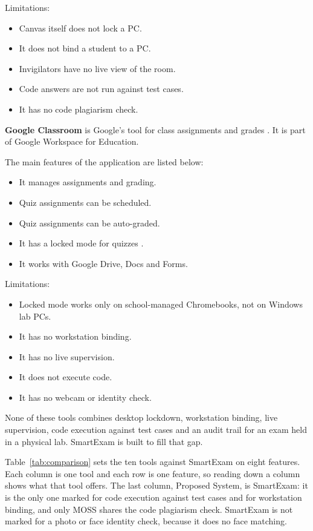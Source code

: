 \noindent Limitations:
\begin{itemize}[noitemsep]
\item Canvas itself does not lock a PC.
\item It does not bind a student to a PC.
\item Invigilators have no live view of the room.
\item Code answers are not run against test cases.
\item It has no code plagiarism check.
\end{itemize}

\noindent\textbf{Google Classroom} is Google's tool for class assignments and grades \cite{gclassroom1}. It is part of Google Workspace for Education.

\noindent The main features of the application are listed below:
\begin{itemize}[noitemsep]
\item It manages assignments and grading.
\item Quiz assignments can be scheduled.
\item Quiz assignments can be auto-graded.
\item It has a locked mode for quizzes \cite{gclassroom_quiz}.
\item It works with Google Drive, Docs and Forms.
\end{itemize}

\noindent Limitations:
\begin{itemize}[noitemsep]
\item Locked mode works only on school-managed Chromebooks, not on Windows lab PCs.
\item It has no workstation binding.
\item It has no live supervision.
\item It does not execute code.
\item It has no webcam or identity check.
\end{itemize}

None of these tools combines desktop lockdown, workstation binding, live supervision, code execution against test cases and an audit trail for an exam held in a physical lab. SmartExam is built to fill that gap.

Table~\ref{tab:comparison} sets the ten tools against SmartExam on eight features. Each column is one tool and each row is one feature, so reading down a column shows what that tool offers. The last column, Proposed System, is SmartExam: it is the only one marked for code execution against test cases and for workstation binding, and only MOSS shares the code plagiarism check. SmartExam is not marked for a photo or face identity check, because it does no face matching.

